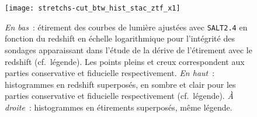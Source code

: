 \documentclass[../main/main.tex]{subfiles}
\begin{document}
\vfill
\begin{figure}[ht!]
    \centerfloat
    \texttt{[image: stretchs-cut\_btw\_hist\_stac\_ztf\_x1]}
    \caption[Présentation des données d'étirement en fonction du redshift pour
    l'échantillon de base combiné aux données de ZTF]{\textit{En bas}~:
        étirement des courbes de lumière ajustées avec \textsc{\texttt{SALT2.4}}
        en fonction du redshift en échelle logarithmique pour l'intégrité des
        sondages apparaissant dans l'étude de la dérive de l'étirement avec le
        redshift (cf.~légende). Les points pleins et creux  correspondent aux
        parties conservative et fiducielle  respectivement. \textit{En haut}~:
        histogrammes en redshift superposés, en sombre et clair pour les parties
        conservative et fiducielle respectivement (cf.\ légende). \textit{À
        droite}~: histogrammes en étirements superposés, même
    légende.}\label{fig:zsample}
\end{figure}
\vfill

\clearpage

\thispagestyle{plain}
\vspace*{\fill}
\minilof
\vspace*{\fill}
\minilot
\vspace*{\fill}

% 
% 
\end{document}
